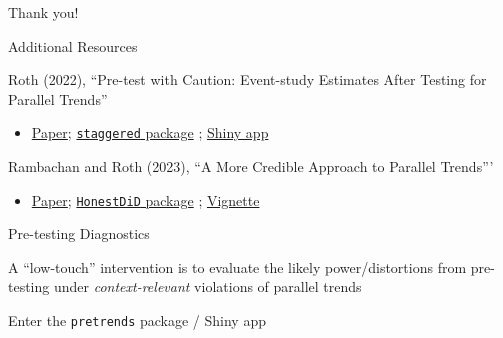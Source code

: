 \documentclass[aspectratio = 169, 13pt]{beamer}
\begin{document}
		
	



\appendix


\begin{frame}
	\centering
	Thank you!
\end{frame}


\begin{frame}{Additional Resources}
	\begin{wideitemize}
		\item
		Roth (2022), ``Pre-test with Caution: Event-study Estimates After Testing for Parallel Trends''
		\begin{itemize}
			\item 
			\href{https://jonathandroth.github.io/assets/files/roth_pretrends_testing.pdf}{Paper}; \href{https://github.com/jonathandroth/pretrends}{\texttt{staggered} package} ; \href{https://github.com/jonathandroth/PretrendsPower\#pretrendspower}{Shiny app}
		\end{itemize}
		
		\item
		Rambachan and Roth (2023), ``A More Credible Approach to Parallel Trends'''
		\begin{itemize}
			\item 
			\href{https://jonathandroth.github.io/assets/files/HonestParallelTrends_Main.pdf}{Paper}; \href{https://github.com/asheshrambachan/HonestDiD}{\texttt{HonestDiD} package} ; \href{https://github.com/asheshrambachan/HonestDiD/blob/master/doc/HonestDiD_Example.pdf}{Vignette}
		\end{itemize}
	\end{wideitemize}
\end{frame}

\begin{frame}[label = power_analysis]{Pre-testing Diagnostics}
	\begin{wideitemize}
		\item
		A ``low-touch'' intervention is to evaluate the likely power/distortions from pre-testing under \textit{context-relevant} violations of parallel trends
		
		\item Enter the \texttt{pretrends} package / Shiny app
	\end{wideitemize}
\end{frame}
\end{document}
